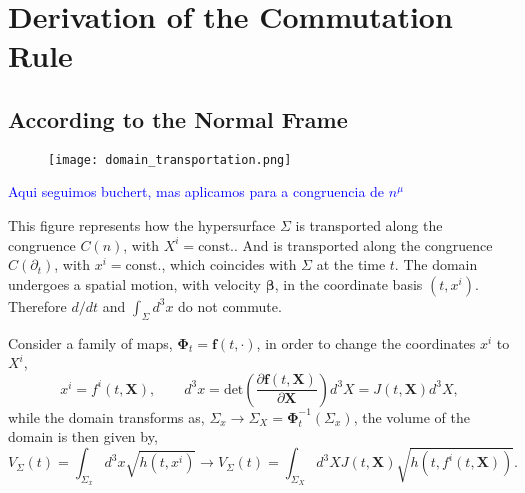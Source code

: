 \chapter{Derivation of the Commutation Rule}
\label{app:comm_rule}

\section{According to the Normal Frame}

\begin{figure}[h]
	\centering
	\texttt{[image: domain\_transportation.png]}
\end{figure}

\textcolor{blue}{Aqui seguimos buchert, mas aplicamos para a congruencia de $n^\mu$}

This figure represents how the hypersurface $\Sigma$ is transported along the congruence $C(n)$, with $X^i=\text{const.}$. 
And is transported along the congruence $C(\partial_t)$, with $x^i=\text{const.}$, which coincides with $\Sigma$ at the time $t$. 
The domain undergoes a spatial motion, with velocity $\mathbf{\beta}$, in the coordinate basis $(t,x^i)$. Therefore $d/dt$ and $\int_\Sigma d^3x$ do not commute.

Consider a family of maps, $\bm{\Phi}_t=\mathbf{f}(t,\cdot)$, in order to change the coordinates $x^i$ to $X^i$,
\begin{equation}
	x^i = f^i(t,\mathbf{X}), \qquad d^3x = \text{det}\left(\frac{\partial \mathbf{f}(t,\mathbf{X})}{\partial \mathbf{X}}\right)d^3X = J(t,\mathbf{X})d^3X,
\end{equation}
while the domain transforms as, $\Sigma_x \rightarrow \Sigma_X = \mathbf{\Phi}^{-1}_t(\Sigma_x)$, the volume of the domain is then given by,
\begin{equation}
	V_\Sigma(t)=\int_{\Sigma_x}d^3x \sqrt{h(t,x^i)} \rightarrow V_\Sigma(t)=\int_{\Sigma_X}d^3X J(t,\mathbf{X})\sqrt{h(t,f^i(t,\mathbf{X}))}.
\end{equation}

